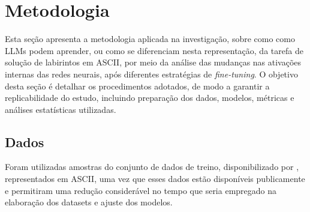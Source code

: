 \section{Metodologia}\label{sec:metodologia}

Esta seção apresenta a metodologia aplicada na investigação, sobre como como LLMs podem aprender, ou como se diferenciam nesta representação, da tarefa de solução de labirintos em ASCII, por meio da análise das mudanças nas ativações internas das redes neurais, após diferentes estratégias de \textit{fine-tuning}. O objetivo desta seção é detalhar os procedimentos adotados, de modo a garantir a replicabilidade do estudo, incluindo preparação dos dados, modelos, métricas e análises estatísticas utilizadas.

\subsection{Dados}

Foram utilizadas amostras do conjunto de dados de treino, disponibilizado por \cite{dao2025alphamaze}, representados em ASCII, uma vez que esses dados estão disponíveis publicamente e permitiram uma redução considerável no tempo que seria empregado na elaboração dos datasets e ajuste dos modelos.


